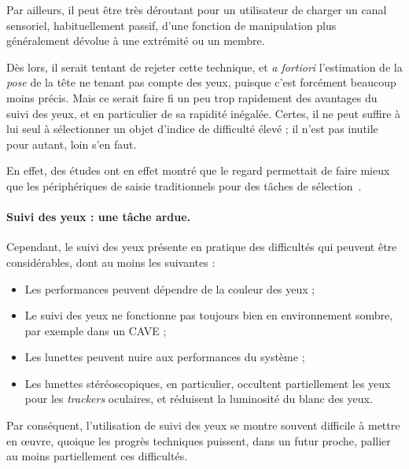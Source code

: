 	Par ailleurs, il peut être très déroutant pour un utilisateur de \og charger \fg{} un canal sensoriel, habituellement passif\footnotemark{}, d'une fonction de manipulation plus généralement dévolue à une extrémité ou un membre.
	
	
	Dès lors, il serait tentant de rejeter cette technique, et \emph{a fortiori} l'estimation de la \emph{pose} de la tête ne tenant pas compte des yeux, puisque c'est forcément beaucoup moins précis. Mais ce serait faire fi un peu trop rapidement des avantages du suivi des yeux, et en particulier de sa rapidité inégalée. Certes, il ne peut suffire à lui seul à sélectionner un objet d'indice de difficulté élevé ; il n'est pas inutile pour autant, loin s'en faut.

	En effet, des études ont en effet montré que le regard permettait de faire mieux que les périphériques de saisie traditionnels pour des tâches de sélection~\cite{stellmach2012look, ware1987evaluation, smith2000hand, bieg2010eye}.
	
	\paragraph{Suivi des yeux : une tâche ardue.}

	Cependant, le suivi des yeux présente en pratique des difficultés qui peuvent être considérables, dont au moins les suivantes :
	
	\begin{itemize}
		\item Les performances peuvent dépendre de la couleur des yeux ;
		\item Le suivi des yeux ne fonctionne pas toujours bien en environnement sombre, par exemple dans un CAVE ;
		\item Les lunettes peuvent nuire aux performances du système ;
		\item Les lunettes stéréoscopiques, en particulier, occultent partiellement les yeux pour les \emph{trackers} oculaires, et réduisent la luminosité du blanc des yeux.
	\end{itemize}

	Par conséquent, l'utilisation de suivi des yeux se montre souvent difficile à mettre en œuvre, quoique les progrès techniques puissent, dans un futur proche, pallier au moins partiellement ces difficultés.
	
